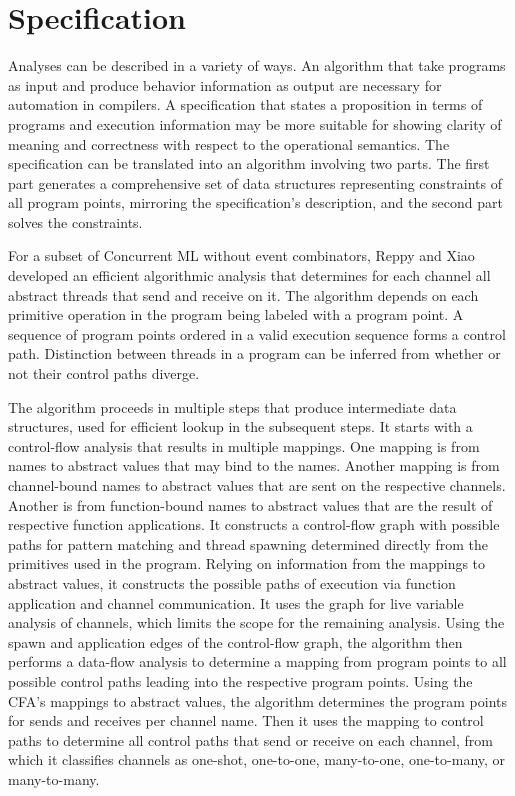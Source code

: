 \documentclass{article}
\begin{document}
\section{Specification}
Analyses can be described in a variety of ways.  An algorithm that take programs as input and
produce behavior information as output are necessary for automation in compilers.  A
specification that states a proposition in terms of programs and execution information may be
more suitable for showing clarity of meaning and correctness with respect to the operational
semantics.  The specification can be translated into an algorithm involving two parts.  The
first part generates a comprehensive set of data structures representing constraints of all
program points, mirroring the specification's description, and the second part solves the
constraints.

For a subset of Concurrent ML without event combinators, Reppy and  Xiao developed an
efficient algorithmic analysis that determines for each channel all abstract threads that send
and receive on it.  The algorithm depends on each primitive operation in the program being
labeled with a program point.  A sequence of program points ordered in a valid execution
sequence forms a control path.  Distinction between threads in a program can be inferred from
whether or not their control paths diverge.  

The algorithm proceeds in multiple steps that produce intermediate data structures, used for
efficient lookup in the subsequent steps.  It starts with a control-flow analysis \cite{} that
results in multiple mappings. One mapping is from names to abstract values that may bind to
the names. Another mapping is from channel-bound names to abstract values that are
sent on the respective channels. Another is from function-bound names to abstract values
that are the result of respective function applications.  It constructs a control-flow graph 
with possible paths for pattern matching and thread spawning determined directly from the
primitives used in the program.  Relying on information from the mappings to abstract values,
it constructs the possible paths of execution via function application and channel
communication.  It uses the graph for live variable analysis of channels, which limits the
scope for the remaining analysis.  Using the spawn and application edges of the control-flow
graph, the algorithm then performs a data-flow analysis to determine a mapping from program
points to all possible control paths leading into the respective program points.  Using the
CFA's mappings to abstract values, the algorithm determines the program points for sends and
receives per channel name.  Then it uses the mapping to control paths to determine all
control paths that send or receive on each channel, from which it classifies channels as
one-shot, one-to-one, many-to-one, one-to-many, or many-to-many.
\end{document}
